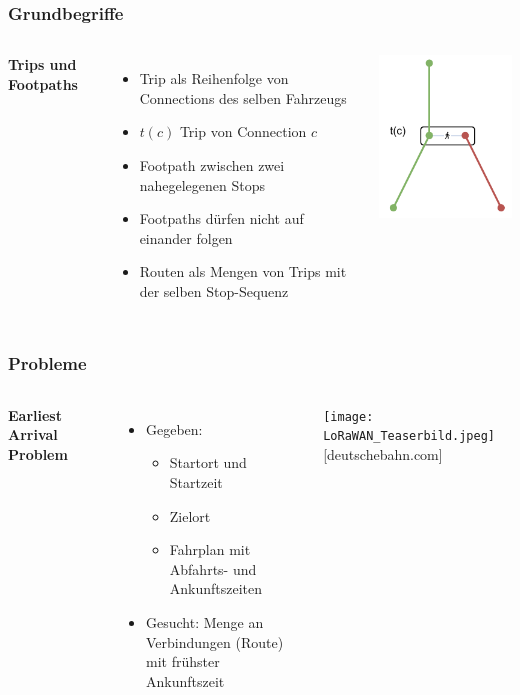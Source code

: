 \documentclass[aspectratio=169]{beamer}
\begin{document}
\begin{frame}
\frametitle{Grundbegriffe}
\begin{columns}[c] %
	
	\textbf{Trips und Footpaths}
	\begin{itemize}
		\item Trip als Reihenfolge von Connections des selben Fahrzeugs
		\item $t(c)$ Trip von Connection $c$
		\item Footpath zwischen zwei nahegelegenen Stops
		\item Footpaths dürfen nicht auf einander folgen
		\item Routen als Mengen von Trips mit der selben Stop-Sequenz
	\end{itemize}
	\includegraphics[scale=1.2]{trips_footpaths.pdf}	
\end{columns}
\end{frame}


\begin{frame}
\frametitle{Probleme}
\begin{columns}[c] %
	
	\textbf{Earliest Arrival Problem}
	\begin{itemize}
		\item Gegeben:
		\begin{itemize}
			\item Startort und Startzeit
			\item Zielort
			\item Fahrplan mit Abfahrts- und Ankunftszeiten
		\end{itemize}
		\item Gesucht: Menge an Verbindungen (Route) \\ mit frühster Ankunftszeit
	\end{itemize}
	\texttt{[image: LoRaWAN\_Teaserbild.jpeg]}	
	\centering
	\tiny [deutschebahn.com]
\end{columns}
\end{frame}
\end{document}
